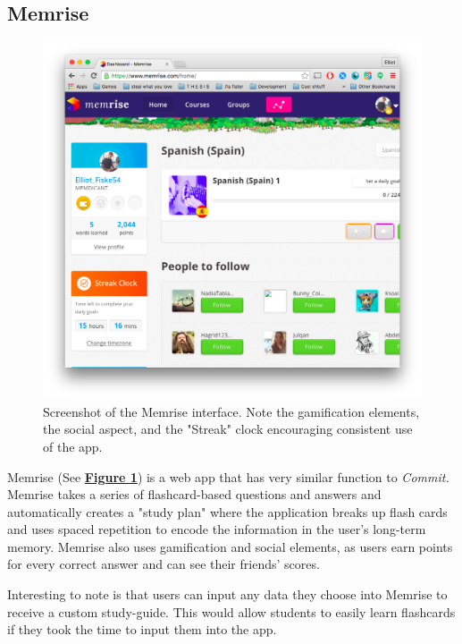 \subsection{Memrise}

\begin{figure}
	\centering
	\includegraphics[width=1.0\linewidth]{memrise}
	\caption[Memrise]{Screenshot of the Memrise interface. Note the gamification elements, the social aspect, and the "Streak" clock encouraging consistent use of the app.}
	\label{fig:memrise}
\end{figure}

\par Memrise (See \textbf{\hyperref[fig:memrise]{Figure \ref*{fig:memrise}}}) is a web app that has very similar function to \textit{Commit.} Memrise takes a series of flashcard-based questions and answers and automatically creates a "study plan" where the application breaks up flash cards and uses spaced repetition to encode the information in the user's long-term memory. Memrise also uses gamification and social elements, as users earn points for every correct answer and can see their friends' scores.

\par Interesting to note is that users can input any data they choose into Memrise to receive a custom study-guide. This would allow students to easily learn flashcards if they took the time to input them into the app.

